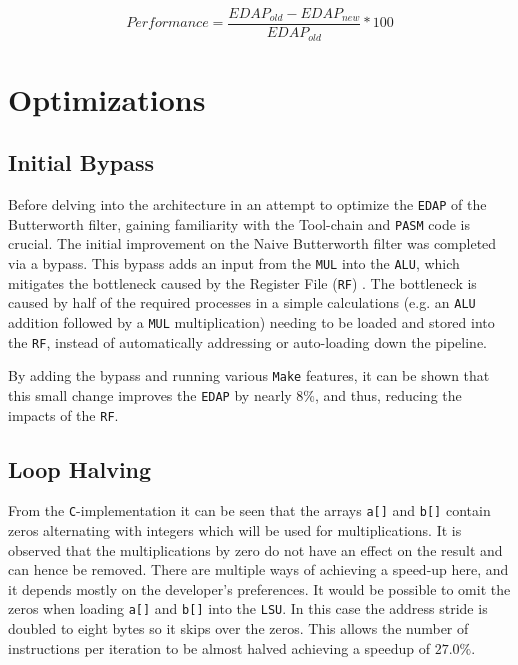 \documentclass[letterpaper, 10 pt, conference]{ieeeconf}  %
\begin{document}
\[
Performance = \frac{EDAP_{old}-EDAP_{new}}{EDAP_{old}}*100
\]

\section{Optimizations}

\subsection{Initial Bypass}
\label{imp:A}

Before delving into the architecture in an attempt to optimize the \texttt{EDAP} of the Butterworth filter, gaining familiarity with the Tool-chain and \texttt{PASM} code is crucial. The initial improvement on the Naive Butterworth filter was completed via a bypass. This bypass adds an input from the \texttt{MUL} into the \texttt{ALU}, which mitigates the bottleneck caused by the Register File (\texttt{RF}) . The bottleneck is caused by half of the required processes in a simple calculations (e.g. an \texttt{ALU} addition followed by a \texttt{MUL} multiplication) needing to be loaded and stored into the \texttt{RF}, instead of automatically addressing or auto-loading down the pipeline. 

By adding the bypass and running various \texttt{Make} features, it can be shown that this small change improves the \texttt{EDAP} by nearly $8\%$, and thus, reducing the impacts of the \texttt{RF}. 

\subsection{Loop Halving}
\label{imp:B}

From the \texttt{C}-implementation it can be seen that the arrays \texttt{a[]} and \texttt{b[]} contain zeros alternating with integers which will be used for multiplications. It is observed that the multiplications by zero do not have an effect on the result and can hence be removed. There are multiple ways of achieving a speed-up here, and it depends mostly on the developer's preferences. It would be possible to omit the zeros when loading \texttt{a[]} and \texttt{b[]} into the \texttt{LSU}. In this case the address stride is doubled to eight bytes so it skips over the zeros. This allows the number of instructions per iteration to be almost halved achieving a speedup of $27.0\%$.
\end{document}
